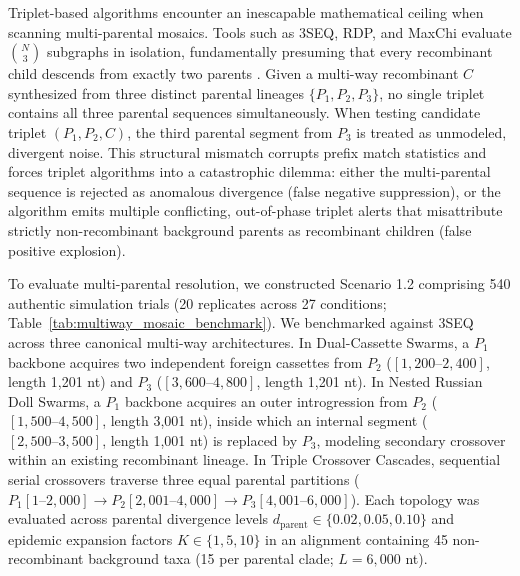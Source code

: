Triplet-based algorithms encounter an inescapable mathematical ceiling when scanning multi-parental mosaics.
Tools such as 3SEQ, RDP, and MaxChi evaluate $\binom{N}{3}$ subgraphs in isolation, fundamentally presuming that every recombinant child descends from exactly two parents \cite{martin2015rdp4,boni2007exact}.
Given a multi-way recombinant $C$ synthesized from three distinct parental lineages $\{P_1, P_2, P_3\}$, no single triplet contains all three parental sequences simultaneously.
When testing candidate triplet $(P_1, P_2, C)$, the third parental segment from $P_3$ is treated as unmodeled, divergent noise.
This structural mismatch corrupts prefix match statistics and forces triplet algorithms into a catastrophic dilemma: either the multi-parental sequence is rejected as anomalous divergence (false negative suppression), or the algorithm emits multiple conflicting, out-of-phase triplet alerts that misattribute strictly non-recombinant background parents as recombinant children (false positive explosion).

To evaluate multi-parental resolution, we constructed Scenario 1.2 comprising 540 authentic simulation trials (20 replicates across 27 conditions; Table~\ref{tab:multiway_mosaic_benchmark}).
We benchmarked \RhizAeon against 3SEQ across three canonical multi-way architectures.
In Dual-Cassette Swarms, a $P_1$ backbone acquires two independent foreign cassettes from $P_2$ ($[1,200\text{--}2,400]$, length 1,201 nt) and $P_3$ ($[3,600\text{--}4,800]$, length 1,201 nt).
In Nested Russian Doll Swarms, a $P_1$ backbone acquires an outer introgression from $P_2$ ($[1,500\text{--}4,500]$, length 3,001 nt), inside which an internal segment ($[2,500\text{--}3,500]$, length 1,001 nt) is replaced by $P_3$, modeling secondary crossover within an existing recombinant lineage.
In Triple Crossover Cascades, sequential serial crossovers traverse three equal parental partitions ($P_1 [1\text{--}2,000] \to P_2 [2,001\text{--}4,000] \to P_3 [4,001\text{--}6,000]$).
Each topology was evaluated across parental divergence levels $d_{\text{parent}} \in \{0.02, 0.05, 0.10\}$ and epidemic expansion factors $K \in \{1, 5, 10\}$ in an alignment containing 45 non-recombinant background taxa (15 per parental clade; $L = 6,000$ nt).


